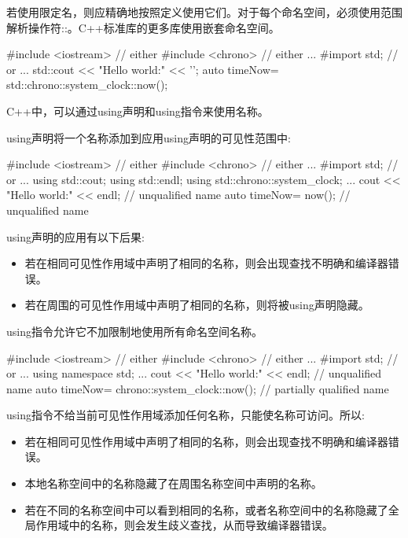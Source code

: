 
若使用限定名，则应精确地按照定义使用它们。对于每个命名空间，必须使用范围解析操作符::。C++标准库的更多库使用嵌套命名空间。

\begin{cpp}
#include <iostream> // either
#include <chrono> // either
...
#import std; // or
...
std::cout << "Hello world:" << '\n';
auto timeNow= std::chrono::system_clock::now();
\end{cpp}


C++中，可以通过using声明和using指令来使用名称。


using声明将一个名称添加到应用using声明的可见性范围中:

\begin{cpp}
#include <iostream> // either
#include <chrono> // either
...
#import std; // or
...
using std::cout;
using std::endl;
using std::chrono::system_clock;
...
cout << "Hello world:" << endl; // unqualified name
auto timeNow= now(); // unqualified name
\end{cpp}

using声明的应用有以下后果:

\begin{itemize}
\item
若在相同可见性作用域中声明了相同的名称，则会出现查找不明确和编译器错误。

\item
若在周围的可见性作用域中声明了相同的名称，则将被using声明隐藏。
\end{itemize}


using指令允许它不加限制地使用所有命名空间名称。

\begin{cpp}
#include <iostream> // either
#include <chrono> // either
...
#import std; // or
...
using namespace std;
...
cout << "Hello world:" << endl; // unqualified name
auto timeNow= chrono::system_clock::now(); // partially qualified name
\end{cpp}

using指令不给当前可见性作用域添加任何名称，只能使名称可访问。所以:

\begin{itemize}
\item
若在相同可见性作用域中声明了相同的名称，则会出现查找不明确和编译器错误。

\item
本地名称空间中的名称隐藏了在周围名称空间中声明的名称。

\item
若在不同的名称空间中可以看到相同的名称，或者名称空间中的名称隐藏了全局作用域中的名称，则会发生歧义查找，从而导致编译器错误。
\end{itemize}

